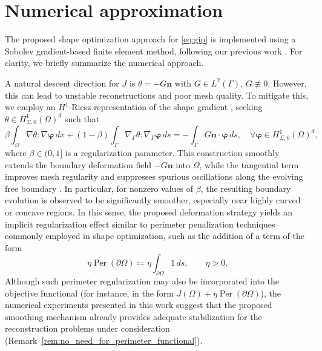 \documentclass[a4paper,11pt]{article}
\newcommand{\vect}[1]{\boldsymbol{\mathbf{#1}}}
\newcommand{\tannabla}{\nabla_{\varGamma}}
\newcommand{\VV}{\theta}
\newcommand{\nn}{\vect{n}}
\newcommand{\intO}[1]{\int_{\varOmega}{#1}{\, {d}{x}}}
\newcommand{\intG}[1]{\int_{\varGamma}{#1}{\, {d}{s}}}
\begin{document}
\section{Numerical approximation}
\label{sec:Numerical_Approximation}

The proposed shape optimization approach for \eqref{eq:gip} is implemented using a Sobolev gradient-based finite element method, following our previous work \cite{AfraitesRabago2025,CherratAfraitesRabago2025b,CherratAfraitesRabago2025}. For clarity, we briefly summarize the numerical approach.

A natural descent direction for $J$ is $\VV = -G\nn$ with $G \in L^2(\varGamma)$, $G \not\equiv 0$. However, this can lead to unstable reconstructions and poor mesh quality. To mitigate this, we employ an $H^1$-Riesz representation of the shape gradient \cite{Doganetal2007,Azegami2020}, seeking $\VV \in H_{\varSigma,0}^{1}(\varOmega)^d$ such that
\begin{equation}\label{eq:Sobolev_gradient_computation}
	\beta \intO{ \nabla \VV : \nabla \vect{\varphi}} + (1 - \beta) \intG{ \tannabla \VV : \tannabla \vect{\varphi} }
	= - \intG{ G \nn \cdot \vect{\varphi} }, \quad \forall \vect{\varphi} \in H_{\varSigma,0}^{1}(\varOmega)^d,
\end{equation}
where $\beta \in (0,1]$ is a regularization parameter. 
This construction smoothly extends the boundary deformation field $-G\nn$ into $\varOmega$, while the tangential term improves mesh regularity and suppresses spurious oscillations along the evolving free boundary \cite{Neuberger1997}. 
In particular, for nonzero values of $\beta$, the resulting boundary evolution is observed to be significantly smoother, especially near highly curved or concave regions. 
In this sense, the proposed deformation strategy yields an implicit regularization effect similar to perimeter penalization techniques commonly employed in shape optimization, such as the addition of a term of the form
\[
	\eta \operatorname{Per}(\partial\varOmega) \coloneqq \eta \int_{\partial\varOmega} 1 \, ds,
\qquad \eta > 0.
\]
Although such perimeter regularization may also be incorporated into the objective functional (for instance, in the form $J(\varOmega) + \eta \operatorname{Per}(\partial\varOmega)$), the numerical experiments presented in this work suggest that the proposed smoothing mechanism already provides adequate stabilization for the reconstruction problems under consideration (Remark~\ref{rem:no_need_for_perimeter_functional}).
\end{document}
